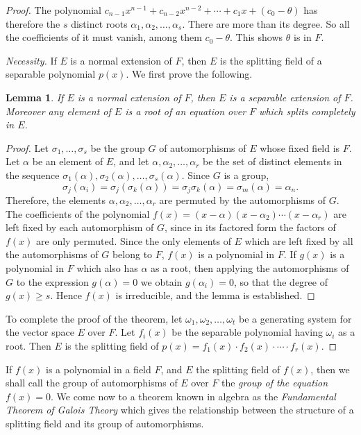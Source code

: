 \documentclass[10pt,leqno,a5paper]{book}
\newtheorem*{lemm*}{Lemma}
\theoremstyle{definition}
\begin{document}
\begin{proof}
The polynomial $c_{n-1}x^{n-1} + c_{n-2}x^{n-2} + \cdots + c_1 x + (c_0 - \theta)$ has therefore the $s$ distinct roots $\alpha_1,\alpha_2,\ldots,\alpha_s$.
There are more than its degree.
So all the coefficients of it must vanish, among them $c_0 - \theta$.
This shows $\theta$ is in $F$.

\emph{Necessity.}\quad
If $E$ is a normal extension of $F$, then $E$ is the splitting field of a separable polynomial $p(x)$.
We first prove the following.

\begin{lemm*}
If $E$ is a normal extension of $F$, then $E$ is a separable extension of $F$.
Moreover any element of $E$ is a root of an equation over $F$ which splits completely in $E$.
\end{lemm*}

\begin{proof}
Let $\sigma_1, \ldots,\sigma_s$ be the group $G$ of automorphisms of $E$ whose fixed field is $F$.
Let $\alpha$ be an element of $E$, and let $\alpha, \alpha_2, \ldots, \alpha_r$ be the set of distinct elements in the sequence $\sigma_1(\alpha), \sigma_2(\alpha), \ldots, \sigma_s(\alpha)$.
Since $G$ is a group,
\[
\sigma_j(\alpha_i)
= \sigma_j(\sigma_k(\alpha))
= \sigma_j \sigma_k(\alpha)
= \sigma_m(\alpha)
= \alpha_n.
\]
Therefore, the elements $\alpha, \alpha_2, \ldots, \alpha_r$ are permuted by the automorphisms of $G$.
The coefficients of the polynomial $f(x) = (x-\alpha)(x-\alpha_2) \cdots (x-\alpha_r)$ are left fixed by each automorphism of $G$, since in its factored form the factors of $f(x)$ are only permuted.
Since the only elements of $E$ which are left fixed by all the automorphisms of $G$ belong to $F$, $f(x)$ is a polynomial in $F$.
If $g(x)$ is a polynomial in $F$ which also has $\alpha$ as a root, then applying the automorphisms of $G$ to the expression $g(\alpha) = 0$ we obtain $g(\alpha_i) = 0$, so that the degree of $g(x) \geq s$.
Hence $f(x)$ is irreducible, and the lemma is established.
\end{proof}

To complete the proof of the theorem, let $\omega_1,\omega_2, \ldots, \omega_t$ be a generating system for the vector space $E$ over $F$.
Let $f_i(x)$ be the separable polynomial having $\omega_i$ as a root.
Then $E$ is the splitting field of $p(x) = f_1(x) \cdot f_2(x) \cdot \cdots \cdot f_r(x)$.
\end{proof}


If $f(x)$ is a polynomial in a field $F$, and $E$ the splitting field of $f(x)$, then we shall call the group of automorphisms of $E$ over $F$ the \emph{group of the equation $f(x) = 0$}.
We come now to a theorem known in algebra as the \emph{Fundamental Theorem of Galois Theory} which gives the relationship between the structure of a splitting field and its group of automorphisms.
\end{document}
